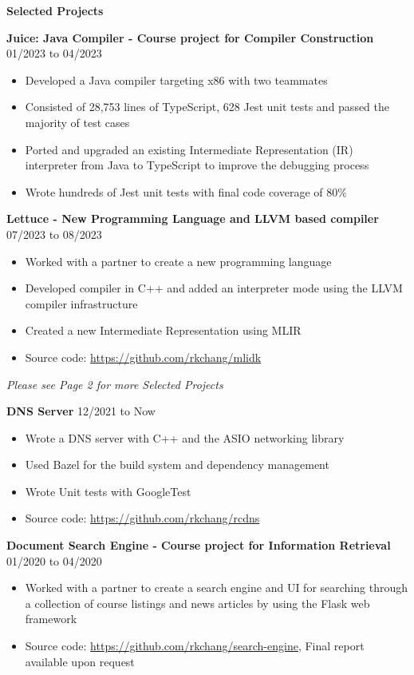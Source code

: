 \documentclass[10pt]{article}
\begin{document}
{\Large\textbf{Selected Projects}}\space \hrulefill

\textbf{Juice: Java Compiler - Course project for Compiler Construction} \hfill 01/2023 to 04/2023
\begin{itemize}[noitemsep]
    \item Developed a Java compiler targeting x86 with two teammates
    \item Consisted of 28,753 lines of TypeScript, 628 Jest unit tests and passed the majority of test cases
    \item Ported and upgraded an existing Intermediate Representation (IR) interpreter from Java to TypeScript to improve the debugging process
    \item Wrote hundreds of Jest unit tests with final code coverage of 80\%
\end{itemize}

\textbf{Lettuce - New Programming Language and LLVM based compiler} \hfill 07/2023 to 08/2023
\begin{itemize}[noitemsep]
    \item Worked with a partner to create a new programming language 
    \item Developed compiler in C++ and added an interpreter mode using the LLVM compiler infrastructure
    \item Created a new Intermediate Representation using MLIR
    \item Source code: \url{https://github.com/rkchang/mlidk}
\end{itemize}

\begin{center}
    \textit{Please see Page 2 for more Selected Projects}
\end{center}

\newpage

\textbf{DNS Server} \hfill 12/2021 to Now
\begin{itemize}[noitemsep]
    \item Wrote a DNS server with C++ and the ASIO networking library
    \item Used Bazel for the build system and dependency management
    \item Wrote Unit tests with GoogleTest
    \item Source code: \url{https://github.com/rkchang/rcdns}
\end{itemize}

\textbf{Document Search Engine - Course project for Information Retrieval} \hfill 01/2020 to 04/2020
\begin{itemize}[noitemsep]
    \item Worked with a partner to create a search engine and UI for searching through a collection of course listings and news articles by using the Flask web framework
    \item Source code: \url{https://github.com/rkchang/search-engine}, Final report available upon request
\end{itemize}
\end{document}
